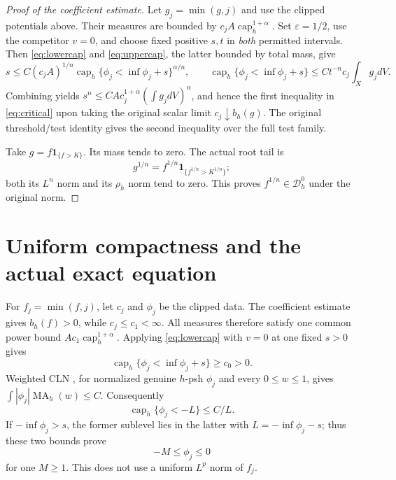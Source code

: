 \documentclass[11pt]{article}
\newcommand{\MA}{\operatorname{MA}}
\newcommand{\capH}{\operatorname{cap}}
\newcommand{\Dzero}{\mathcal D_h^0}
\theoremstyle{remark}\newtheorem{remark}[theorem]{Remark}
\begin{document}
\begin{proof}[Proof of the coefficient estimate]
Let $g_j=\min(g,j)$ and use the clipped potentials above. Their measures
are bounded by $c_jA\capH_h^{1+\alpha}$. Set $\varepsilon=1/2$,
use the competitor $v=0$, and choose fixed positive $s,t$ in \emph{both}
permitted intervals. Then \eqref{eq:lowercap} and
\eqref{eq:uppercap}, the latter bounded by total mass, give
\[
 s\leq C(c_jA)^{1/n}\capH_h\{\phi_j<\inf\phi_j+s\}^{\alpha/n},
 \qquad
 \capH_h\{\phi_j<\inf\phi_j+s\}
    \leq Ct^{-n}c_j\int_Xg_jdV.
\]
Combining yields
$s^n\leq C A c_j^{1+\alpha}(\int g_jdV)^\alpha$, and hence
the first inequality in \eqref{eq:critical} upon taking the original
scalar limit $c_j\downarrow b_h(g)$. The original threshold/test
identity gives the second inequality over the full test family.

Take $g=f\mathbf1_{\{f>K\}}$. Its mass tends to zero. The actual root
tail is
\[
 g^{1/n}=f^{1/n}\mathbf1_{\{f^{1/n}>K^{1/n}\}};
\]
both its $L^n$ norm and its $\rho_h$ norm tend to zero.
This proves $f^{1/n}\in\Dzero$ under the original norm.
\end{proof}

\section{Uniform compactness and the actual exact equation}
For $f_j=\min(f,j)$, let $c_j$ and $\phi_j$ be the clipped data.
The coefficient estimate gives $b_h(f)>0$, while $c_j\leq c_1<\infty$.
All measures therefore satisfy one common power bound
$Ac_1\capH_h^{1+\alpha}$. Applying \eqref{eq:lowercap} with $v=0$
at one fixed $s>0$ gives
\[
 \capH_h\{\phi_j<\inf\phi_j+s\}\geq c_0>0.
\]
Weighted CLN \cite[Proposition 1.1]{Ngu}, for normalized genuine
$h$-psh $\phi_j$ and every $0\leq w\leq1$, gives
$\int|\phi_j|\MA_h(w)\leq C$. Consequently
\[
 \capH_h\{\phi_j<-L\}\leq C/L.
\]
If $-\inf\phi_j>s$, the former sublevel lies in the latter with
$L=-\inf\phi_j-s$; thus these two bounds prove
\begin{equation}\label{eq:bound}
 -M\leq\phi_j\leq0
\end{equation}
for one $M\geq1$. This does not use a uniform $L^p$ norm of $f_j$.
\end{document}
